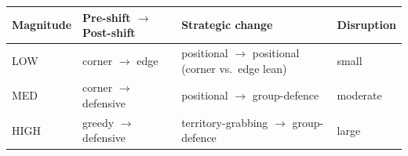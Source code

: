 \begin{table}[t]
  \centering
  \label{tab:magnitudes}
  \small
  \begin{tabular}{@{}llll@{}}
    \toprule
    Magnitude & Pre-shift $\rightarrow$ Post-shift & Strategic change & Disruption \\
    \midrule
    LOW  & corner $\rightarrow$ edge      & positional $\rightarrow$ positional (corner vs.\ edge lean) & small \\
    MED  & corner $\rightarrow$ defensive & positional $\rightarrow$ group-defence & moderate \\
    HIGH & greedy $\rightarrow$ defensive & territory-grabbing $\rightarrow$ group-defence & large \\
    \bottomrule
  \end{tabular}
\end{table}
